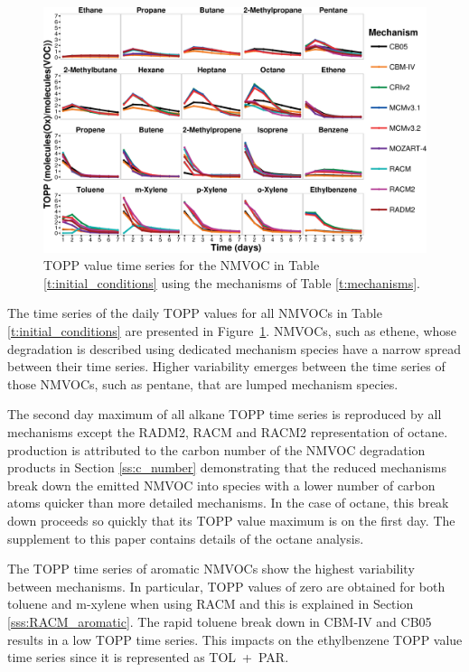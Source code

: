\begin{figure}
    \begin{center}
        \includegraphics[width=\textwidth]{img/TOPP_daily_values_all_species}
    \end{center}
    \caption{TOPP value time series for the NMVOC in Table \ref{t:initial_conditions} using the mechanisms of Table \ref{t:mechanisms}.}
    \label{f:TOPP_dailies}
\end{figure}

The time series of the daily TOPP values for all NMVOCs in Table \ref{t:initial_conditions} are presented in \mbox{Figure \ref{f:TOPP_dailies}}. 
NMVOCs, such as ethene, whose degradation is described using dedicated mechanism species have a narrow spread between their time series. 
Higher variability emerges between the time series of those NMVOCs, such as pentane, that are lumped mechanism species.

The second day maximum of all alkane TOPP time series is reproduced by all mechanisms except the RADM2, RACM and RACM2 representation of octane. 
 production is attributed to the carbon number of the NMVOC degradation products in Section \ref{ss:c_number} demonstrating that the reduced mechanisms break down the emitted NMVOC into species with a lower number of carbon atoms quicker than more detailed mechanisms. 
In the case of octane, this break down proceeds so quickly that its TOPP value maximum is on the first day. 
The supplement to this paper contains details of the octane analysis.

The TOPP time series of aromatic NMVOCs show the highest variability between mechanisms. 
In particular, TOPP values of zero are obtained for both toluene and m-xylene when using RACM and this is explained in Section \ref{sss:RACM_aromatic}. 
The rapid toluene break down in CBM-IV and CB05 results in a low TOPP time series. 
This impacts on the ethylbenzene TOPP value time series since it is represented as \mbox{TOL + PAR}.

